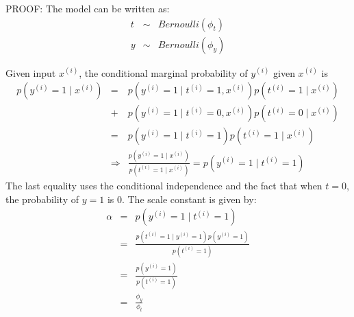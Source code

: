 \begin{answer}

PROOF: The model can be written as:
\begin{eqnarray*}
    t &\sim& Bernoulli(\phi_t) \\
    y &\sim& Bernoulli(\phi_y)
\end{eqnarray*}

Given input $x^{(i)}$, the conditional marginal probability of $y^{(i)}$ given $x^{(i)}$ is
\begin{eqnarray*}
p(y^{(i)} = 1\mid x^{(i)}) 
    &=& p(y^{(i)} = 1 \mid t^{(i)} = 1, x^{(i)}) p(t^{(i)} = 1\mid x^{(i)}) \\
    &+& p(y^{(i)} = 1 \mid t^{(i)} = 0, x^{(i)}) p(t^{(i)} = 0\mid x^{(i)}) \\
    &=& p(y^{(i)} = 1 \mid t^{(i)} = 1) p(t^{(i)} = 1\mid x^{(i)}) \\
    &\Rightarrow& \frac{p(y^{(i)} = 1\mid x^{(i)}) } {p(t^{(i)} = 1\mid x^{(i)})} = p(y^{(i)} = 1 \mid t^{(i)} = 1)
\end{eqnarray*}
The last equality uses the conditional independence and the fact that when $t=0$, the probability of $y=1$ is 0. The scale constant
is given by:
\begin{eqnarray*}
\alpha 
    &=& p(y^{(i)} = 1 \mid t^{(i)} = 1) \\
    &=& \frac{p(t^{(i)} = 1 \mid y^{(i)} = 1) p(y^{(i)} = 1)}{p(t^{(i)} = 1)} \\
    &=& \frac{p(y^{(i)} = 1)}{p(t^{(i)} = 1)} \\
    &=& \frac{\phi_y}{\phi_t} 
\end{eqnarray*}

\end{answer}
